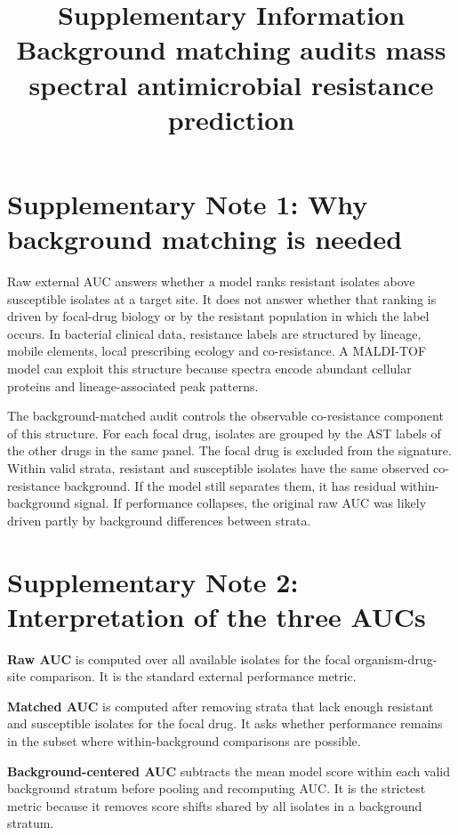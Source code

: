 \documentclass[11pt]{article}
\title{\bfseries Supplementary Information\\Background matching audits mass spectral antimicrobial resistance prediction}
\author{}
\date{}
\begin{document}
\maketitle

\section*{Supplementary Note 1: Why background matching is needed}

Raw external AUC answers whether a model ranks resistant isolates above susceptible isolates at a target site. It does not answer whether that ranking is driven by focal-drug biology or by the resistant population in which the label occurs. In bacterial clinical data, resistance labels are structured by lineage, mobile elements, local prescribing ecology and co-resistance. A MALDI-TOF model can exploit this structure because spectra encode abundant cellular proteins and lineage-associated peak patterns.

The background-matched audit controls the observable co-resistance component of this structure. For each focal drug, isolates are grouped by the AST labels of the other drugs in the same panel. The focal drug is excluded from the signature. Within valid strata, resistant and susceptible isolates have the same observed co-resistance background. If the model still separates them, it has residual within-background signal. If performance collapses, the original raw AUC was likely driven partly by background differences between strata.

\section*{Supplementary Note 2: Interpretation of the three AUCs}

\textbf{Raw AUC} is computed over all available isolates for the focal organism-drug-site comparison. It is the standard external performance metric.

\textbf{Matched AUC} is computed after removing strata that lack enough resistant and susceptible isolates for the focal drug. It asks whether performance remains in the subset where within-background comparisons are possible.

\textbf{Background-centered AUC} subtracts the mean model score within each valid background stratum before pooling and recomputing AUC. It is the strictest metric because it removes score shifts shared by all isolates in a background stratum.
\end{document}
